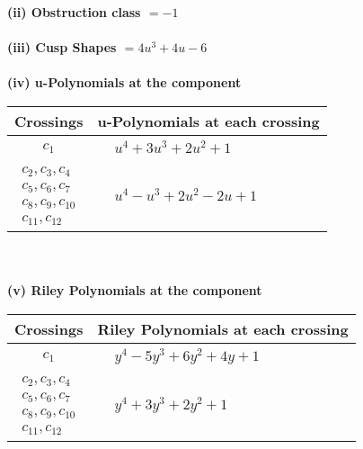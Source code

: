\documentclass[1p]{elsarticle_modified}
\theoremstyle{definition}
\begin{document}
\flushleft \textbf{(ii) Obstruction class $= -1$}\\~\\
\flushleft \textbf{(iii) Cusp Shapes $= 4 u^3+4 u-6$}\\~\\
\newpage\renewcommand{\arraystretch}{1}
\flushleft \textbf{(iv) u-Polynomials at the component}\newline \\
\begin{tabular}{m{50pt}|m{274pt}}
Crossings & \hspace{64pt}u-Polynomials at each crossing \\
\hline $$\begin{aligned}c_{1}\end{aligned}$$&$\begin{aligned}
&u^4+3 u^3+2 u^2+1
\end{aligned}$\\
\hline $$\begin{aligned}c_{2},c_{3},c_{4}\\c_{5},c_{6},c_{7}\\c_{8},c_{9},c_{10}\\c_{11},c_{12}\end{aligned}$$&$\begin{aligned}
&u^4- u^3+2 u^2-2 u+1
\end{aligned}$\\
\hline
\end{tabular}\\~\\
\newpage\renewcommand{\arraystretch}{1}
\flushleft \textbf{(v) Riley Polynomials at the component}\newline \\
\begin{tabular}{m{50pt}|m{274pt}}
Crossings & \hspace{64pt}Riley Polynomials at each crossing \\
\hline $$\begin{aligned}c_{1}\end{aligned}$$&$\begin{aligned}
&y^4-5 y^3+6 y^2+4 y+1
\end{aligned}$\\
\hline $$\begin{aligned}c_{2},c_{3},c_{4}\\c_{5},c_{6},c_{7}\\c_{8},c_{9},c_{10}\\c_{11},c_{12}\end{aligned}$$&$\begin{aligned}
&y^4+3 y^3+2 y^2+1
\end{aligned}$\\
\hline
\end{tabular}\\~\\
\end{document}
